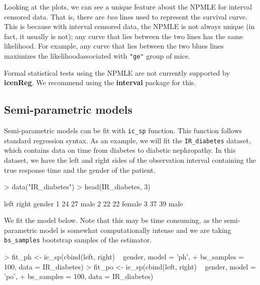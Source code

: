 \documentclass[a4paper]{article}
\begin{document}
Looking at the plots, we can see a unique feature about the NPMLE for interval censored data. That is, there are \emph{two} lines used to represent the survival curve. This is because with interval censored data, the NPMLE is not always unique (in fact, it usually is not); any curve that lies between the two lines has the same likelihood. For example, any curve that lies between the two blues lines maximizes the likelihoodassociated with \texttt{"ge"} group of mice. 

Formal statistical tests using the NPMLE are not currently supported by {\bf icenReg}. We recommend using the {\bf interval} package for this. 

\subsection{Semi-parametric models}

Semi-parametric models can be fit with \texttt{ic\_sp} function. This function follows standard regression syntax. As an example, we will fit the \texttt{IR\_diabetes} dataset, which contains data on time from diabetes to diabetic nephropathy. In this dataset, we have the left and right sides of the observation interval containing the true response time and the gender of the patient. 
  
\begin{Schunk}
\begin{Sinput}
> data("IR_diabetes")
> head(IR_diabetes, 3)
\end{Sinput}
\begin{Soutput}
  left right gender
1   24    27   male
2   22    22 female
3   37    39   male
\end{Soutput}
\end{Schunk}
  
We fit the model below. Note that this may be time consuming, as the semi-parametric model is somewhat computationally intense and we are taking \texttt{bs\_samples} bootstrap samples of the estimator. 
  
\begin{Schunk}
\begin{Sinput}
>   fit_ph <- ic_sp(cbind(left, right) ~ gender, model = 'ph', 
+                   bs_samples = 100, data = IR_diabetes)
>   fit_po <- ic_sp(cbind(left, right) ~ gender, model = 'po',
+                   bs_samples = 100, data = IR_diabetes)
\end{Sinput}
\end{Schunk}
\end{document}
